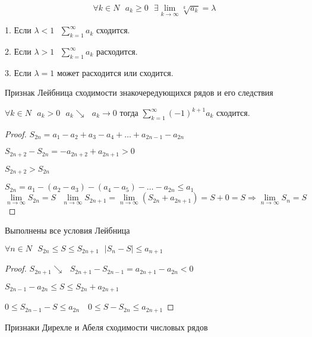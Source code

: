 \begin{block}
  $$
  \forall k \in N ~~~ a_k \ge 0 ~~~ \exists \lim_{k \to \infty} \sqrt[k]{a_k} =
  \lambda
  $$

  1. Если $\lambda < 1 ~~~ \sum_{k=1}^{\infty} a_k$ сходится.

  2. Если $\lambda > 1 ~~~ \sum_{k=1}^{\infty} a_k$ расходится.

  3. Если $\lambda = 1$ может расходится или сходится.
\end{block}

\begin{title}[\Large]
  Признак Лейбница сходимости знакочередующихся рядов и его следствия
\end{title}

\begin{block}
  $\forall k \in N ~~~ a_k > 0 ~~~ a_k \searrow ~~~ a_k \to 0$ тогда
  $\sum_{k=1}^{\infty} (-1)^{k+1} a_k$ сходится.
\end{block}

\begin{proof}
  $S_{2n} = a_1 - a_2 + a_3 - a_4 + \ldots + a_{2n-1} - a_{2n}$

  $S_{2n+2} - S_{2n} = -a_{2n+2} + a_{2n+1} > 0$

  $S_{2n+2} > S_{2n}$

  $S_{2n} = a_1 - (a_2 - a_3) - (a_4 - a_5) - \ldots - a_{2n} \le a_1$
  $$
  \lim_{n \to \infty} S_{2n} = S ~~~ \lim_{n \to \infty} S_{2n+1} =
  \lim_{n \to \infty} (S_{2n} + a_{2n+1}) = S + 0 = S \Rightarrow
  \lim_{n \to \infty} S_n = S
  $$
\end{proof}

\begin{block}[Следствие:]
  Выполнены все условия Лейбница

  $\forall n \in N ~~~ S_{2n} \le S \le S_{2n+1} ~~~ |S_n - S| \le a_{n+1}$
\end{block}

\begin{proof}
  $S_{2n+1} \searrow ~~~ S_{2n+1} - S_{2n-1} = a_{2n+1} - a_{2n} < 0$

  $S_{2n-1} - a_{2n} \le S \le S_{2n} + a_{2n+1}$

  $0 \le S_{2n-1} - S \le a_{2n} ~~~ $
  $0 \le S - S_{2n} \le a_{2n+1}$
\end{proof}

\begin{title}[\Large]
  Признаки Дирехле и Абеля сходимости числовых рядов
\end{title}

